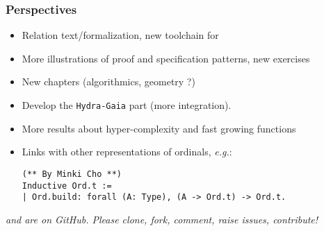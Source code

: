 \documentclass[10pt, fleqn]{beamer}
\begin{document}

\begin{frame}[fragile]
  \frametitle{Perspectives}

  \begin{block}{}
  
    \begin{itemize}
      
 \item Relation text/formalization,  new toolchain for \alectr
 \item More illustrations of proof and specification patterns,  new exercises
       \item New chapters (algorithmics, geometry ?)
 \end{itemize}

 \vspace{8pt}
 
   \begin{itemize}
 \item Develop the \texttt{Hydra-Gaia} part (more integration).
 \item More results about hyper-complexity and fast growing functions
 \item  Links with other representations of ordinals, \emph{e.g.}:
  \begin{footnotesize}
    {\color{blue}
\begin{verbatim}
(** By Minki Cho **)
Inductive Ord.t :=
| Ord.build: forall (A: Type), (A -> Ord.t) -> Ord.t.
\end{verbatim}
      }
    \end{footnotesize}
   

     \end{itemize}
  \end{block}

  \begin{block}{}
  {\it \Hydras and  \community are on GitHub. Please clone, fork, comment, raise issues, contribute!}
\end{block}
 
  
\end{frame}
\end{document}
